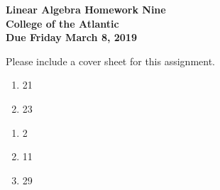 \documentclass[11pt]{article}
\begin{document}
\pagestyle{empty}
 
\begin{center}
{\Large {\bf Linear Algebra Homework Nine}}\\
\medskip
{\large {\bf College of the Atlantic}}\\
\medskip
{\large {\bf Due Friday March 8, 2019}}\\
\medskip
\end{center}



\noindent Please include a cover sheet for this assignment.\\

\begin{enumerate}
\setlength{\itemsep}{-1mm}
\item 21
\item 23
\end{enumerate}


\begin{enumerate}
\setlength{\itemsep}{-1mm}
\item 2
\item 11
\item 29
\end{enumerate}
\end{document}
